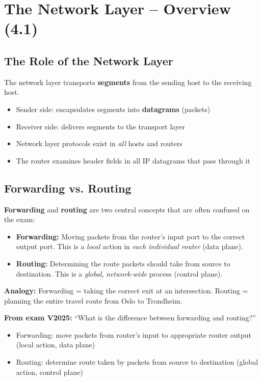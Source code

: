 \section{The Network Layer -- Overview (4.1)}

\subsection{The Role of the Network Layer}

\begin{keybox}
The network layer transports \textbf{segments} from the sending host to the receiving host.
\begin{itemize}[noitemsep]
    \item Sender side: encapsulates segments into \textbf{datagrams} (packets)
    \item Receiver side: delivers segments to the transport layer
    \item Network layer protocols exist in \emph{all} hosts and routers
    \item The router examines header fields in all IP datagrams that pass through it
\end{itemize}
\end{keybox}

\subsection{Forwarding vs. Routing}

\begin{exambox}
\textbf{Forwarding} and \textbf{routing} are two central concepts that are often confused on the exam:
\begin{itemize}[noitemsep]
    \item \textbf{Forwarding:} Moving packets from the router's input port to the correct output port. This is a \emph{local} action in \emph{each individual router} (data plane).
    \item \textbf{Routing:} Determining the route packets should take from source to destination. This is a \emph{global}, \emph{network-wide} process (control plane).
\end{itemize}

\medskip
\textbf{Analogy:} Forwarding = taking the correct exit at an intersection. Routing = planning the entire travel route from Oslo to Trondheim.

\medskip
\textbf{From exam V2025:} ``What is the difference between forwarding and routing?''
\begin{itemize}[noitemsep]
    \item Forwarding: move packets from router's input to appropriate router output (local action, data plane)
    \item Routing: determine route taken by packets from source to destination (global action, control plane)
\end{itemize}
\end{exambox}

